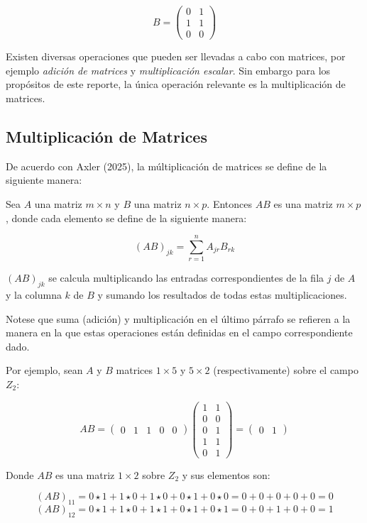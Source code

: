 \documentclass{article}
\begin{document}
$$
B = \begin{pmatrix}
    0 & 1 \\
    1 & 1 \\
    0 & 0
\end{pmatrix}
$$

Existen diversas operaciones que pueden ser llevadas a cabo con matrices, por ejemplo \textit{adición de matrices} y \textit{multiplicación escalar}. Sin embargo para los propósitos de este reporte, la única operación relevante es la multiplicación de matrices.

\subsection{Multiplicación de Matrices}

De acuerdo con Axler (2025), la múltiplicación de matrices se define de la siguiente manera:

Sea $A$ una matriz $m \times n$ y $B$ una matriz $n \times p$. Entonces $AB$ es una matriz $ m \times p $, donde cada elemento se define de la siguiente manera:

$$
(AB)_{jk} = \sum_{r=1}^n A_{jr} B_{rk}
$$

$(AB)_{jk}$ se calcula multiplicando las entradas correspondientes de la fila $j$ de $A$ y la columna $k$ de $B$ y sumando los resultados de todas estas multiplicaciones.

Notese que suma (adición) y multiplicación en el último párrafo se refieren a la manera en la que estas operaciones están definidas en el campo correspondiente dado. 

Por ejemplo, sean $A$ y $B$ matrices $1 \times 5$ y $5 \times 2$ (respectivamente) sobre el campo $Z_2$:

$$
AB = \begin{pmatrix}
    0 & 1 & 1 & 0 & 0
\end{pmatrix}
\begin{pmatrix}
    1 & 1 \\
    0 & 0 \\
    0 & 1 \\
    1 & 1 \\
    0 & 1
\end{pmatrix}
= \begin{pmatrix}
    0 & 1
\end{pmatrix}
$$

Donde $AB$ es una matriz $1 \times 2$ sobre $Z_2$ y sus elementos son:

$$
(AB)_{11} = 0 \star 1 + 1 \star 0 + 1 \star 0 + 0 \star 1 + 0 \star 0 = 0 + 0 + 0 + 0 + 0 = 0
$$$$
(AB)_{12} = 0 \star 1 + 1 \star 0 + 1 \star 1 + 0 \star 1 + 0 \star 1 = 0 + 0 + 1 + 0 + 0 = 1
$$
\end{document}
